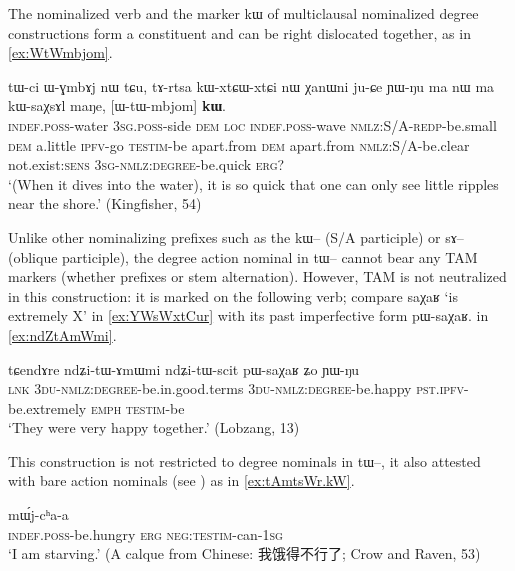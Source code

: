 \documentclass[oldfontcommands,oneside,a4paper,11pt]{article}
\newcommand{\ipa}[1]{{\phon #1}} %
\newcommand{\zh}[1]{{\cn #1}}
\begin{document}
The nominalized verb and the marker \ipa{kɯ} of multiclausal  nominalized degree constructions form a constituent and can be right dislocated together, as in \ref{ex:WtWmbjom}.

 \begin{exe}
\ex \label{ex:WtWmbjom}
\gll 
\ipa{tɯ-ci}  	\ipa{ɯ-ɣmbɤj}  	\ipa{nɯ}  	\ipa{tɕu,}  	  	\ipa{tɤ-rtsa}  	\ipa{kɯ-xtɕɯ-xtɕi}  	\ipa{nɯ}  	\ipa{χanɯni}  	\ipa{ju-ɕe}  	\ipa{ɲɯ-ŋu}  	\ipa{ma}  	\ipa{nɯ}  	\ipa{ma}  	\ipa{kɯ-saχsɤl}  	\ipa{maŋe,}  	[\ipa{ɯ-tɯ-mbjom}]  	\ipa{\textbf{kɯ}.}  \\
\textsc{indef.poss}-water \textsc{3sg.poss}-side \textsc{dem} \textsc{loc} \textsc{indef.poss}-wave \textsc{nmlz:S/A-redp}-be.small \textsc{dem} a.little \textsc{ipfv}-go \textsc{testim}-be apart.from \textsc{dem} apart.from   \textsc{nmlz:S/A}-be.clear not.exist:\textsc{sens} \textsc{3sg-nmlz:degree}-be.quick \textsc{erg?} \\
\glt `(When it dives into the water), it is so quick that one can only see little ripples near the shore.'
 (Kingfisher, 54)
\end{exe}

Unlike other nominalizing prefixes such as the \ipa{kɯ--} (S/A participle) or \ipa{sɤ--} (oblique participle), the degree action nominal in \ipa{tɯ--} cannot bear any TAM markers (whether prefixes or stem alternation). However, TAM is not neutralized in this construction: it is marked on the following verb; compare \ipa{saχaʁ} `is extremely X' in \ref{ex:YWsWxtCur} with its past imperfective form \ipa{pɯ-saχaʁ}.
in \ref{ex:ndZtAmWmi}.

 \begin{exe}
\ex \label{ex:ndZtAmWmi}
\gll 
 \ipa{tɕendɤre}  	\ipa{ndʑi-tɯ-ɤmɯmi}  	\ipa{ndʑi-tɯ-scit}  	\ipa{pɯ-saχaʁ}  	\ipa{ʑo}  	\ipa{ɲɯ-ŋu}  \\
 \textsc{lnk} \textsc{3du-nmlz:degree}-be.in.good.terms \textsc{3du-nmlz:degree}-be.happy \textsc{pst.ipfv}-be.extremely \textsc{emph} \textsc{testim}-be \\
 \glt `They were very happy together.' (Lobzang, 13)
\end{exe}

This construction is not restricted to degree nominals in \ipa{tɯ--}, it also attested with bare action nominals (see \citealt[7-9]{jacques14antipassive}) as in \ref{ex:tAmtsWr.kW}.
    \begin{exe}
  \ex  \label{ex:tAmtsWr.kW}  
  \gll [\ipa{tɤ-mtsɯr}]  	\ipa{kɯ}  	\ipa{mɯ́j-cʰa-a}  \\
  \textsc{indef.poss}-be.hungry \textsc{erg} \textsc{neg:testim}-can-\textsc{1sg} \\
\glt `I am starving.'  (A calque from Chinese: \zh{我饿得不行了}; Crow and Raven, 53) 
   \end{exe} 
  
\end{document}
